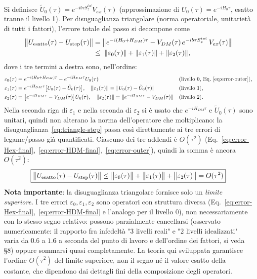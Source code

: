 \documentclass[11pt,a4paper]{article}
\begin{document}
Si definisce $\tilde U_0(\tau)=e^{-ib\tau S_z^{tot}}V_{ex}(\tau)$ (approssimazione di $U_0(\tau)=e^{-iH_0\tau}$, esatto tranne il livello 1). Per disuguaglianza triangolare (norma operatoriale, unitarietà di tutti i fattori), l'errore totale del passo si decompone come
\begin{align}
\big\|U_{\rm esatto}(\tau)-U_{\rm step}(\tau)\big\| &= \big\|e^{-i(H_0+H_{DM})\tau} - V_{DM}(\tau)\,e^{-ib\tau S_z^{tot}}\,V_{ex}(\tau)\big\| \notag\\
&\le\; \|\varepsilon_0(\tau)\| + \|\varepsilon_1(\tau)\| + \|\varepsilon_2(\tau)\|,
\label{eq:triangle-step}
\end{align}
dove i tre termini a destra sono, nell'ordine:
\begin{align}
\varepsilon_0(\tau) &= e^{-i(H_0+H_{DM})\tau}-e^{-iH_{DM}\tau}U_0(\tau) &&\text{(livello 0, Eq.~\eqref{eq:error-outer})},\\
\varepsilon_1(\tau) &= e^{-iH_{DM}\tau}\big[U_0(\tau)-\tilde U_0(\tau)\big], \quad \|\varepsilon_1(\tau)\|=\|U_0(\tau)-\tilde U_0(\tau)\| &&\text{(livello 1)},\\
\varepsilon_2(\tau) &= \big[e^{-iH_{DM}\tau}-V_{DM}(\tau)\big]\tilde U_0(\tau), \quad \|\varepsilon_2(\tau)\|=\|e^{-iH_{DM}\tau}-V_{DM}(\tau)\| &&\text{(livello 2)}.
\end{align}
Nella seconda riga di $\varepsilon_1$ e nella seconda di $\varepsilon_2$ si è usato che $e^{-iH_{DM}\tau}$ e $\tilde U_0(\tau)$ sono unitari, quindi non alterano la norma dell'operatore che moltiplicano: la disuguaglianza~\eqref{eq:triangle-step} passa così direttamente ai tre errori di legame/passo già quantificati. Ciascuno dei tre addendi è $O(\tau^2)$ (Eq.~\eqref{eq:error-Hex-final},~\eqref{eq:error-HDM-final},~\eqref{eq:error-outer}), quindi la somma è ancora $O(\tau^2)$:
\begin{equation}
\boxed{\big\|U_{\rm esatto}(\tau)-U_{\rm step}(\tau)\big\| \le \big\|\varepsilon_0(\tau)\big\|+\big\|\varepsilon_1(\tau)\big\|+\big\|\varepsilon_2(\tau)\big\| = O(\tau^2)}
\label{eq:total-error-bound}
\end{equation}
\textbf{Nota importante}: la disuguaglianza triangolare fornisce solo un \emph{limite superiore}. I tre errori $\varepsilon_0,\varepsilon_1,\varepsilon_2$ sono operatori con struttura diversa (Eq.~\eqref{eq:error-Hex-final},~\eqref{eq:error-HDM-final} e l'analogo per il livello 0), non necessariamente con lo stesso segno relativo: possono parzialmente cancellarsi (osservato numericamente: il rapporto fra infedeltà "3 livelli reali" e "2 livelli idealizzati" varia da $0.6$ a $1.6$ a seconda del punto di lavoro e dell'ordine dei fattori, si veda \texttt{} \S8) oppure sommarsi quasi completamente. La teoria qui sviluppata garantisce l'ordine $O(\tau^2)$ del limite superiore, non il segno né il valore esatto della costante, che dipendono dai dettagli fini della composizione degli operatori.
\end{document}
